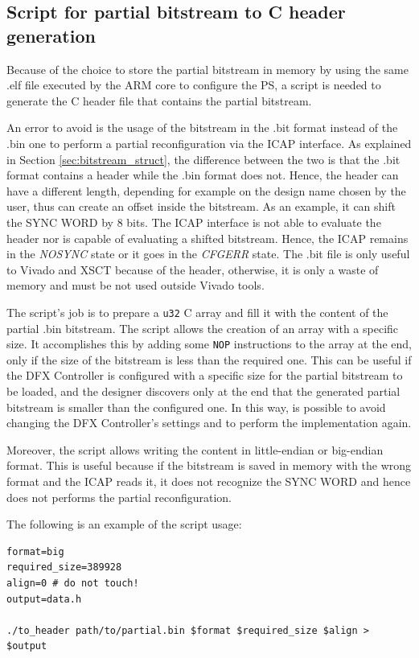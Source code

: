 \subsection{Script for partial bitstream to C header generation}
\label{sec:script_header}

Because of the choice to store the partial bitstream in memory by using the same .elf file executed by the ARM core to configure the PS, a script is needed to generate the C header file that contains the partial bitstream. \bigskip

An error to avoid is the usage of the bitstream in the .bit format instead of the .bin one to perform a partial reconfiguration via the ICAP interface. As explained in Section \ref{sec:bitstream_struct}, the difference between the two is that the .bit format contains a header while the .bin format does not. Hence, the header can have a different length, depending for example on the design name chosen by the user, thus can create an offset inside the bitstream. As an example, it can shift the SYNC WORD by 8 bits. The ICAP interface is not able to evaluate the header nor is capable of evaluating a shifted bitstream. Hence, the ICAP remains in the \textit{NOSYNC} state or it goes in the \textit{CFGERR} state. The .bit file is only useful to Vivado and XSCT because of the header, otherwise, it is only a waste of memory and must be not used outside Vivado tools.\bigskip

The script's job is to prepare a \texttt{u32} C array and fill it with the content of the partial .bin bitstream. The script allows the creation of an array with a specific size. It accomplishes this by adding some \texttt{NOP} instructions to the array at the end, only if the size of the bitstream is less than the required one. This can be useful if the DFX Controller is configured with a specific size for the partial bitstream to be loaded, and the designer discovers only at the end that the generated partial bitstream is smaller than the configured one. In this way, is possible to avoid changing the DFX Controller's settings and to perform the implementation again. \bigskip

Moreover, the script allows writing the content in little-endian or big-endian format. This is useful because if the bitstream is saved in memory with the wrong format and the ICAP reads it, it does not recognize the SYNC WORD and hence does not performs the partial reconfiguration.\bigskip

The following is an example of the script usage:
\begin{lstlisting}[style=preformatted]
format=big
required_size=389928
align=0 # do not touch!
output=data.h

./to_header path/to/partial.bin $format $required_size $align > $output
\end{lstlisting}
